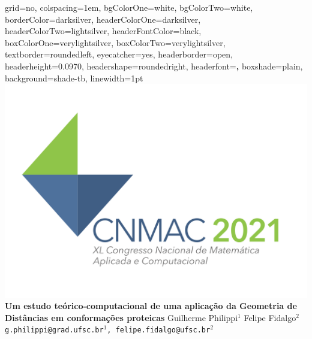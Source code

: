 \documentclass[portrait,final]{baposter}
\begin{document}
	
	\newlength{\leftimgwidth}
	\begin{poster}%
		{
			grid=no,
			colspacing=1em,
			bgColorOne=white,
			bgColorTwo=white,
			borderColor=darksilver,
			headerColorOne=darksilver,
			headerColorTwo=lightsilver,
			headerFontColor=black,
			boxColorOne=verylightsilver,
			boxColorTwo=verylightsilver,
			textborder=roundedleft,
			eyecatcher=yes,
			headerborder=open,
			headerheight=0.0970\textheight,
			headershape=roundedright,
			headerfont=\large \textbf, %
			boxshade=plain,
			background=shade-tb,
			linewidth=1pt
		}
		{\includegraphics[scale=0.14]{LOGOTIPO_cnmac_2021.png}}%
		{\sf\bf \LARGE Um estudo teórico-computacional de uma aplicação da Geometria de Distâncias em conformações proteicas  \vspace*{0.5em}}
		{\sf \large Guilherme Philippi$^1$ \hspace{0.5em}  \hspace{0.5em} Felipe Fidalgo$^2$ \\  \vspace*{0.5em}
			{\tt \normalsize g.philippi@grad.ufsc.br$^1$, felipe.fidalgo@ufsc.br$^2$} }

\end{poster}
\end{document}
